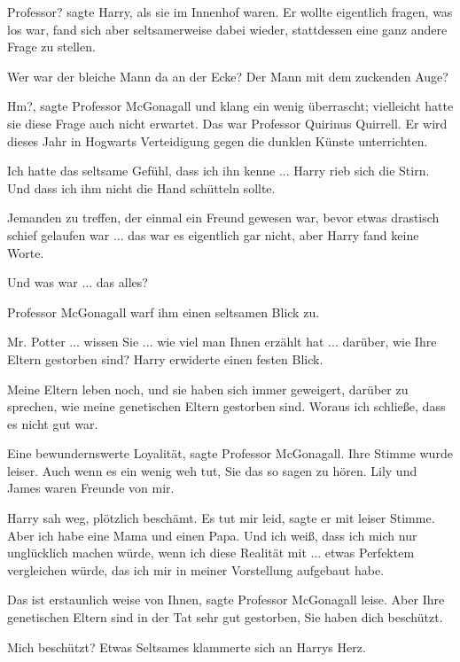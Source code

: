 \glqq{}Professor?\grqq{} sagte Harry, als sie im Innenhof waren. Er wollte
eigentlich fragen, was los war, fand sich aber seltsamerweise dabei wieder,
stattdessen eine ganz andere Frage zu stellen.

\glqq{}Wer war der bleiche Mann da an der Ecke? Der Mann mit dem zuckenden
Auge?\grqq{}

\glqq{}Hm?\grqq{}, sagte Professor McGonagall und klang ein wenig überrascht;
vielleicht hatte sie diese Frage auch nicht erwartet. \glqq{}Das war Professor
Quirinus Quirrell. Er wird dieses Jahr in Hogwarts Verteidigung gegen die
dunklen Künste unterrichten.\grqq{}

\glqq{}Ich hatte das seltsame Gefühl, dass ich ihn kenne ...\grqq{} Harry rieb
sich die Stirn. \glqq{}Und dass ich ihm nicht die Hand schütteln sollte.\grqq{}

Jemanden zu treffen, der einmal ein Freund gewesen war, bevor etwas drastisch
schief gelaufen war ... das war es eigentlich gar nicht, aber Harry fand keine
Worte.

\glqq{}Und was war ... das alles?\grqq{}

Professor McGonagall warf ihm einen seltsamen Blick zu.

\glqq{}Mr. Potter ... wissen Sie ... wie viel man Ihnen erzählt hat ... darüber, wie
Ihre Eltern gestorben sind?\grqq{} Harry erwiderte einen festen Blick.

\glqq{}Meine Eltern leben noch, und sie haben sich immer geweigert, darüber zu
sprechen, wie meine genetischen Eltern gestorben sind. Woraus ich schließe, dass
es nicht gut war.\grqq{}

\glqq{}Eine bewundernswerte Loyalität\grqq{}, sagte Professor McGonagall. Ihre
Stimme wurde leiser. \glqq{}Auch wenn es ein wenig weh tut, Sie das so sagen zu
hören. Lily und James waren Freunde von mir.\grqq{}

Harry sah weg, plötzlich beschämt. \glqq{}Es tut mir leid\grqq{}, sagte er mit
leiser Stimme. \glqq{}Aber ich habe eine Mama und einen Papa. Und ich weiß, dass
ich mich nur unglücklich machen würde, wenn ich diese Realität mit ... etwas
Perfektem vergleichen würde, das ich mir in meiner Vorstellung aufgebaut
habe.\grqq{}

\glqq{}Das ist erstaunlich weise von Ihnen\grqq{}, sagte Professor McGonagall
leise. \glqq{}Aber Ihre genetischen Eltern sind in der Tat sehr gut gestorben,
Sie haben dich beschützt.\grqq{}

Mich beschützt? Etwas Seltsames klammerte sich an Harrys Herz.

